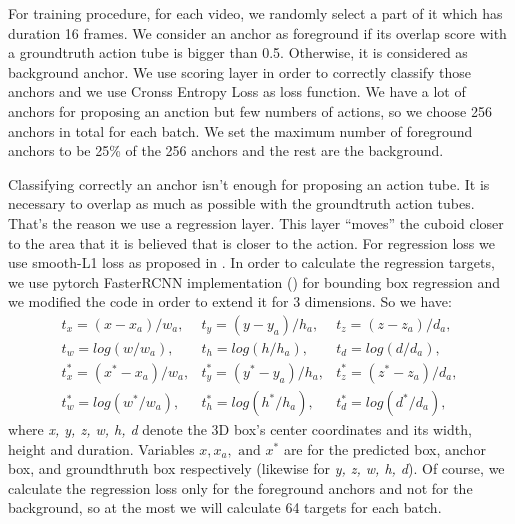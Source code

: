 For training procedure, for each video, we randomly select a part of it which has duration 16 frames. We consider an anchor as foreground if its overlap score with a groundtruth
action tube is bigger than 0.5. Otherwise, it is considered as background anchor. We use scoring layer in order to correctly classify those anchors and we use
Cronss Entropy Loss as loss function. We have a lot of anchors for proposing an anction but few numbers of actions, so we choose 256 anchors in total for each batch. We set the maximum
number of foreground anchors to be  25\% of the 256 anchors and the rest are the background.\par
Classifying correctly an anchor isn't enough for proposing an action tube. It is necessary to overlap as much as possible with the groundtruth action tubes. That's the reason we use a
regression layer. This layer ``moves'' the cuboid closer to the area that it is believed that is closer to the action.
For regression loss we use smooth-L1 loss as proposed in \cite{DBLP:journals/corr/GirshickDDM13}. In order to calculate
the regression targets, we use pytorch FasterRCNN implementation (\cite{jjfaster2rcnn}) for bounding box regression and 
we modified the code in order to extend it for 3 dimensions. %
So we have:
\[ \begin{matrix}
    t_x = (x-x_a)/w_a, & t_y = (y-y_a)/h_a, & t_z= (z-z_a)/d_a, \\
    t_w= log(w/w_a), & t_h= log(h/h_a), & t_d = log(d/d_a), \\
    t^*_x = (x^* - x_a)/w_a, & t^*_y = (y^* - y_a)/h_a, & t^*_z = (z^* - z_a)/d_a, \\
    t^*_w = log(w^* /w_a), & t^*_h = log(h^*/h_a), & t^*_d = log(d^*/d_a),
  \end{matrix}
\]
where \textit{x, y, z, w, h, d} denote the 3D box's center coordinates and its width, height and duration. Variables $x, x_a, \text{ and } x^*$
are for the predicted box, anchor box, and groundthruth box respectively (likewise for \textit{y, z, w, h, d}). Of course, we calculate the
regression loss only for the foreground anchors and not for the background, so at the most we will calculate 64 targets
for each batch. \par

